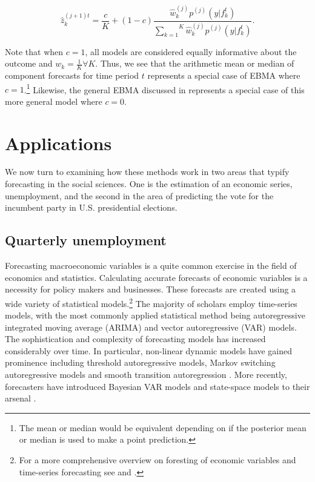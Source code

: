 \documentclass[12pt,fullpage,endnotes]{article}
\begin{document}
\begin{equation}
\hat{z}^{(j+1)t}_{k} = \frac{c}{K} + (1-c)\frac{\hat{w}^{(j)}_k
p^{(j)}(y|f_{k}^{t})}{\overset{K}{\underset{k=1}{\sum}}\hat{w}^{(j)}_kp^{(j)}(y|f_{k}^{t})}.
\end{equation}




Note that when $c=1$, all models are considered equally informative
about the outcome and $w_k=\frac{1}{K} \forall K$. Thus, we see that
the arithmetic mean or median of component forecasts for time period
$t$ represents a special case of EBMA where $c=1$.\footnote{The mean
  or median would be equivalent depending on if the posterior mean or
  median is used to make a point prediction.}  Likewise, the general
EBMA discussed in \citet{mhw:2012} represents a special case of this
more general model where $c=0$.


\section{Applications}
\label{empirics}

We now turn to examining how these methods work in two areas that
typify forecasting in the social sciences. One is the estimation of an
economic series, unemployment, and the second in the area of
predicting the vote for the incumbent party in U.S. presidential
elections.


\subsection{Quarterly unemployment}
\label{econ}

Forecasting macroeconomic variables is a quite common exercise in the
field of economics and statistics. Calculating accurate forecasts of
economic variables is a necessity for policy makers and
businesses. These forecasts are created using a wide variety of
statistical models.\footnote{For a more comprehensive overview on
  foresting of economic variables and time-series forecasting see
  \citet{Elliott:Timmermann:2008} and \citet{Goijer:Hyndman:2006}.}
The majority of scholars employ time-series models, with the most
commonly applied statistical method being autoregressive integrated
moving average (ARIMA) and vector autoregressive (VAR) models. The
sophistication and complexity of forecasting models has increased
considerably over time. In particular, non-linear dynamic models have
gained prominence including threshold autoregressive models, Markov
switching autoregressive models and smooth transition autoregression
\citep{Elliott:Timmermann:2008,Montgomery:etal:1998}. More recently,
forecasters have introduced Bayesian VAR models and state-space models
to their arsenal \citep{Goijer:Hyndman:2006,Elliott:Timmermann:2008}.
\end{document}
